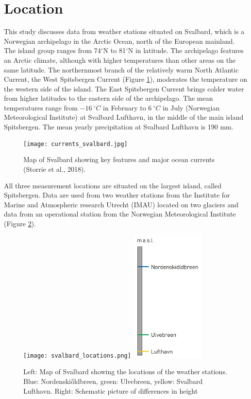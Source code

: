 \documentclass[11pt]{report}
\begin{document}

\section{Location} \label{sec:loc}
This study discusses data from weather stations situated on Svalbard, which is a Norwegian archipelago in the Arctic Ocean, north of the European mainland. The island group ranges from 74$^\circ$N to 81$^\circ$N in latitude. The archipelago features an Arctic climate, although with higher temperatures than other areas on the same latitude.  The northernmost branch of the relatively warm North Atlantic Current, the West Spitsbergen Current (Figure \ref{fig:current}), moderates the temperature on the western side of the island. The East Spitsbergen Current brings colder water from higher latitudes to the eastern side of the archipelago. The mean temperatures range from $\SI{-16}{^\circ C}$ in February to $\SI{6}{^\circ C}$ in July (Norwegian Meteorological Institute) at Svalbard Lufthavn, in the middle of the main island Spitsbergen. The mean yearly precipitation at Svalbard Lufthavn is 190 mm. 
 

\begin{figure}[h]
\texttt{[image: currents\_svalbard.jpg]}
\centering{}
\caption{Map of Svalbard showing key features and major ocean currents (Storrie et al., 2018).}
\label{fig:current}
\end{figure}

All three measurement locations are situated on the largest island, called Spitsbergen. Data are used from two weather stations from the Institute for Marine and Atmospheric research Utrecht (IMAU) located on two glaciers and data from an operational station from the Norwegian Meteorological Institute (Figure \ref{fig:locations}).

\begin{figure}[h]
\texttt{[image: svalbard\_locations.png]}
\includegraphics[scale=1, width=0.33\textwidth]{height.jpg}
\centering{}
\caption{Left: Map of Svalbard showing the locations of the weather stations. Blue: Nordenski\H{o}ldbreen, green: Ulvebreen, yellow: Svalbard Lufthavn. Right: Schematic picture of differences in height}
\label{fig:locations}
\end{figure}
\end{document}

